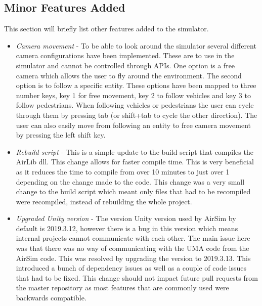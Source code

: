 \subsection{Minor Features Added}
This section will briefly list other features added to the simulator. 
\begin{itemize}
 \item \emph{Camera movement} - To be able to look around the simulator several different camera configurations have been implemented. These are to use in the simulator and cannot be controlled through APIs. One option is a free camera which allows the user to fly around the environment. The second option is to follow a specific entity. These options have been mapped to three number keys, key 1 for free movement, key 2 to follow vehicles and key 3 to follow pedestrians. When following vehicles or pedestrians the user can cycle through them by pressing tab (or shift+tab to cycle the other direction). The user can also easily move from following an entity to free camera movement by pressing the left shift key. 
 \item \emph{Rebuild script} - This is a simple update to the build script that compiles the AirLib dll. This change allows for faster compile time. This is very beneficial as it reduces the time to compile from over 10 minutes to just over 1 depending on the change made to the code. This change was a very small change to the build script which meant only files that had to be recompiled were recompiled, instead of rebuilding the whole project. 
 \item \emph{Upgraded Unity version} - The version Unity version used by AirSim by default is 2019.3.12, however there is a bug in this version which means internal projects cannot communicate with each other. The main issue here was that there was no way of communicating with the UMA code from the AirSim code. This was resolved by upgrading the version to 2019.3.13. This introduced a bunch of dependency issues as well as a couple of code issues that had to be fixed. This change should not impact future pull requests from the master repository as most features that are commonly used were backwards compatible. 
\end{itemize}
